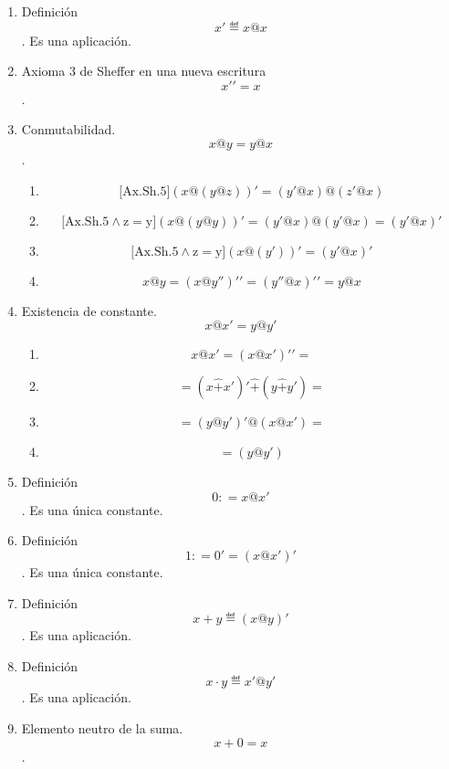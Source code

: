 \documentclass[
]{article}
\providecommand{\tightlist}{%
  \setlength{\itemsep}{0pt}\setlength{\parskip}{0pt}}
\begin{document}
\begin{enumerate}
\begin{enumerate}
\begin{enumerate}
\begin{enumerate}
        \begin{enumerate}
        \def\labelenumv{\arabic{enumv}.}
        \item
          Definición \[x' ≝ x@x\]. Es una aplicación.
        \item
          Axioma 3 de Sheffer en una nueva escritura \[x'{' = x}\].
        \item
          Conmutabilidad. \[x@{y = y}@x\].

          \begin{enumerate}
          \def\labelenumvi{\arabic{enumvi}.}
          \tightlist
          \item
            \[\mathbf{\mathrm{\lbrack{Ax.Sh.5}\rbrack}}{({x@{({y@z})}})}{' = {({y'@x})}}@{({z'@x})}\]
          \item
            \[\mathbf{\mathrm{\lbrack{{{Ax.Sh.5} \land z} = y}\rbrack}}{({x@{({y@y})}})}{' = {({y'@x})}}@{{({y'@x})} = {({y'@x})}}'\]
          \item
            \[\mathbf{\mathrm{\lbrack{{{Ax.Sh.5} \land z} = y}\rbrack}}{({x@{({y'})}})}{' = {({y'@x})}}'\]
          \item
            \[x@{y = {({x@y''})}}'{' = {({y''@x})}}'{' = {y@x}}\]
          \end{enumerate}
        \item
          Existencia de constante. \[x@x{' = y}@y'\]

          \begin{enumerate}
          \def\labelenumvi{\arabic{enumvi}.}
          \tightlist
          \item
            \[{{x@{x'}} = {({x@{x'}})}}'{' =}\]
          \item
            \[{= {({x\widehat{+}{x'}})}}'\widehat{+}{{({y\widehat{+}{y'}})} =}\]
          \item
            \[{= {({y@{y'}})}}'@{{({x@{x'}})} =}\]
          \item
            \[= {({y@{y'}})}\]
          \end{enumerate}
        \item
          Definición \[0{: = x}@x'\]. Es una única constante.
        \item
          Definición \[1{: = 0}{' = {({x@x'})}}'\]. Es una única
          constante.
        \item
          Definición \[{x + y} ≝ {({x@y})}'\]. Es una aplicación.
        \item
          Definición \[{x \cdot y} ≝ {x'@y'}\]. Es una aplicación.
        \item
          Elemento neutro de la suma. \[{x + 0} = x\].


\end{enumerate}
\end{enumerate}
\end{enumerate}
\end{enumerate}
\end{enumerate}
\end{document}
